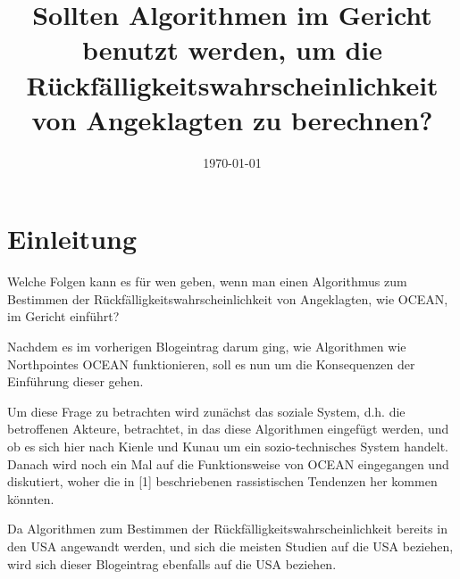 \documentclass[10pt, a4paper, twocolumn]{article} %
\title{Sollten Algorithmen im Gericht benutzt werden, um die Rückfälligkeitswahrscheinlichkeit von Angeklagten zu berechnen? } %
\author{
	\authorstyle{Gruppe: 10\\ Journalist: Jonas Opitz\\ Chefredakteur: Frank Eric Mbouga} %
}
\date{\today} %
\begin{document}
\maketitle %

\thispagestyle{firstpage} %


\section{Einleitung}
Welche Folgen kann es für wen geben, wenn man einen Algorithmus zum Bestimmen der Rückfälligkeitswahrscheinlichkeit von Angeklagten, wie OCEAN, im Gericht einführt?

Nachdem es im vorherigen Blogeintrag darum ging, wie Algorithmen wie Northpointes OCEAN funktionieren, soll es nun um die Konsequenzen der Einführung dieser gehen.

Um diese Frage zu betrachten wird zunächst das soziale System, d.h. die betroffenen Akteure, betrachtet, in das diese Algorithmen eingefügt werden, und ob es sich hier nach Kienle und Kunau um ein sozio-technisches System handelt.
Danach wird noch ein Mal auf die Funktionsweise von OCEAN eingegangen und diskutiert, woher die in [1] beschriebenen rassistischen Tendenzen her kommen könnten.

Da Algorithmen zum Bestimmen der Rückfälligkeitswahrscheinlichkeit bereits in den USA angewandt werden, und sich die meisten Studien auf die USA beziehen, wird sich dieser Blogeintrag ebenfalls auf die USA beziehen.

\end{document}
